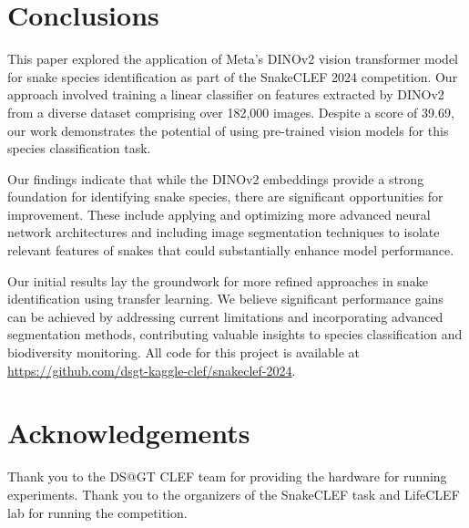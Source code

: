 \documentclass[]{ceurart}
\begin{document}
\section{Conclusions}

This paper explored the application of Meta's DINOv2 vision transformer model for snake species identification as part of the SnakeCLEF 2024 competition. 
Our approach involved training a linear classifier on features extracted by DINOv2 from a diverse dataset comprising over 182,000 images. 
Despite a score of 39.69, our work demonstrates the potential of using pre-trained vision models for this species classification task.

Our findings indicate that while the DINOv2 embeddings provide a strong foundation for identifying snake species, there are significant opportunities for improvement. 
These include applying and optimizing more advanced neural network architectures and including image segmentation techniques to isolate relevant features of snakes that could substantially enhance model performance.

Our initial results lay the groundwork for more refined approaches in snake identification using transfer learning. 
We believe significant performance gains can be achieved by addressing current limitations and incorporating advanced segmentation methods, contributing valuable insights to species classification and biodiversity monitoring.
All code for this project is available at \url{https://github.com/dsgt-kaggle-clef/snakeclef-2024}.

\section*{Acknowledgements}

Thank you to the DS@GT CLEF team for providing the hardware for running experiments. Thank you to the organizers of the SnakeCLEF task and LifeCLEF lab for running the competition.



\end{document}
